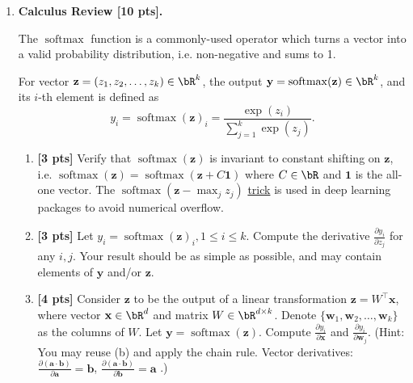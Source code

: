\documentclass{article}
\DeclareMathOperator*{\softmax}{softmax}
\def\pts#1{\textbf{[#1 pts]}}
\def\vx{\mathbf{x}}
\def\vy{\mathbf{y}}
\def\vz{\mathbf{z}}
\def\vw{\mathbf{w}}
\newenvironment{Q}{\clearpage \item}{\phantom{s} \bigskip}
\begin{document}
\begin{enumerate}

\begin{Q}
\textbf{Calculus Review \pts{10}.}

The $\softmax$ function is a commonly-used operator which turns a vector into a valid probability distribution, i.e. non-negative and sums to 1.
    
For vector $\vz = (z_1, z_2, \ldots, z_k) \in \bR^k $, the output $\vy = \softmax(\vz) \in \bR^k$, and its $i$-th element is defined as 
\begin{equation}
    y_i = \softmax(\vz)_i = \frac{ \exp(z_i) }{ \sum_{j=1}^k \exp(z_j) } .
\end{equation}

\begin{enumerate}
    \item \pts3
    Verify that $\softmax(\vz)$ is invariant to constant shifting on $\vz$, i.e. $\softmax(\vz) = \softmax(\vz + C\mathbf{1})$ where $C \in \bR$ and $\mathbf{1}$ is the all-one vector. The $\softmax(\vz - \max_j z_j)$ \href{https://timvieira.github.io/blog/post/2014/02/11/exp-normalize-trick/}{trick} is used in deep learning packages to avoid numerical overflow.
    
    \vspace{3cm}
    
    \item \pts3
    Let $y_i = \softmax(\vz)_i, 1\le i\le k$. Compute the derivative
    $ \frac{\partial y_i}{\partial z_j} $ for any $i,j$.
    Your result should be as simple as possible, and may contain elements of $\vy$ and/or $\vz$.
    
    \vspace{5cm}
    
    \item \pts4
    Consider $\vz$ to be the output of a linear transformation
    $ \vz = W^\top \vx $, where vector $ \vx \in \bR^d $ and matrix $ W \in \bR^{d \times k} $. 
    Denote $ \{ \vw_1, \vw_2, \ldots, \vw_k \}$ as the columns of $W$. Let $\vy = \softmax(\vz) $.
    Compute $ \frac{\partial y_i}{\partial \vx} $ and $ \frac{\partial y_i}{\partial \vw_j} $. 
    (Hint: You may reuse (b) and apply the chain rule. 
    Vector derivatives: $ \frac{\partial (\mathbf{a} \cdot \mathbf{b}) }{\partial \mathbf{a} } = \mathbf{b} $, $ \frac{\partial (\mathbf{a} \cdot \mathbf{b}) }{\partial \mathbf{b} } = \mathbf{a} $ .)
    

\end{enumerate}
\end{Q}
\end{enumerate}
\end{document}
